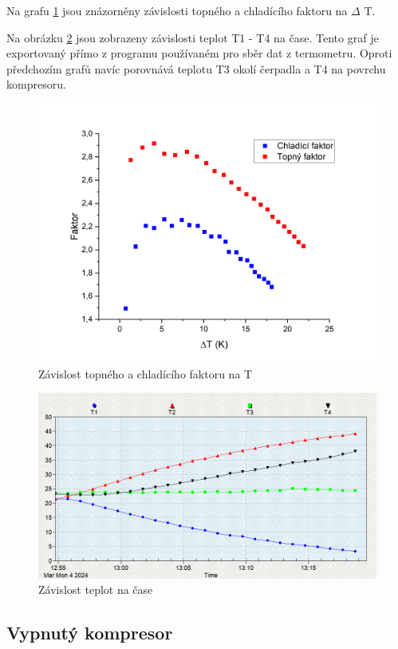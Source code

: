 Na grafu \ref{fig:faktor(T)} jsou znázorněny závislosti topného a chladícího faktoru na \(\Delta\) T.

Na obrázku \ref{fig:teploty-cas-zap} jsou zobrazeny závislosti teplot T1 - T4 na čase. Tento graf je exportovaný přímo z programu používaném pro sběr dat z termometru. Oproti předchozím grafů navíc porovnává teplotu T3 okolí čerpadla a T4 na povrchu kompresoru.

\newpage

\begin{figure}[h]
    \centering
    \includegraphics[width=0.68\linewidth]{27 - Tepelné čerpadlo//Protokol_tepelné čerpadlo//img/Faktor(T).png}
    \caption{Závislost topného a chladícího faktoru na \Delta T}
    \label{fig:faktor(T)}
\end{figure}

\begin{figure}[h]
    \centering
    \includegraphics[width=0.8\linewidth]{27 - Tepelné čerpadlo//Protokol_tepelné čerpadlo//img/Zap.png}
    \caption{Závislost teplot na čase}
    \label{fig:teploty-cas-zap}
\end{figure}

\subsection{Vypnutý kompresor}

